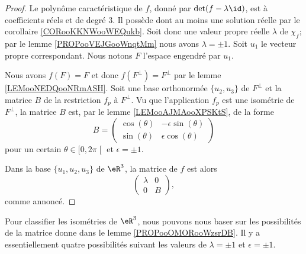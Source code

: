 \begin{proof}
    Le polynôme caractéristique de \( f\), donné par \( \det(f-\lambda\id)\), est à coefficients réels et de degré \( 3\). Il possède dont au moins une solution réelle par le corollaire \ref{CORooKKNWooWEQukb}. Soit donc une valeur propre réelle \( \lambda\) de \( \chi_f\); par le lemme \ref{PROPooVEJGooWnqtMm} nous avons \( \lambda=\pm 1\). Soit \( u_1\) le vecteur propre correspondant. Nous notons \( F\) l'espace engendré par \( u_1\).

    Nous avons \( f(F)=F\) et donc \( f(F^{\perp})=F^{\perp}\) par le lemme \ref{LEMooNEDQooNRmASH}. Soit une base orthonormée \( \{ u_2,u_3 \}\) de \( F^{\perp}\) et la matrice \( B\) de la restriction \( f_{p}\) à \( F^{\perp}\). Vu que l'application \( f_p\) est une isométrie de \( F^{\perp}\), la matrice \( B\) est, par le lemme \ref{LEMooAJMAooXPSKtS}, de la forme
    \begin{equation}
        B=\begin{pmatrix}
            \cos(\theta)    &   -\epsilon\sin(\theta)    \\ 
            \sin(\theta)    &   \epsilon\cos(\theta)    
        \end{pmatrix}
    \end{equation}
    pour un certain \( \theta\in\mathopen[ 0 , 2\pi \mathclose[\) et \( \epsilon=\pm 1\).

    Dans la base \( \{u_1,u_2,u_3\}\) de \( \eR^3\), la matrice de \( f\) est alors
    \begin{equation}
        \begin{pmatrix}
            \lambda    &   0    \\ 
            0    &   B    
        \end{pmatrix},
    \end{equation}
    comme annoncé.
\end{proof}

Pour classifier les isométries de \( \eR^3\), nous pouvons nous baser sur les possibilités de la matrice donne dans le lemme \ref{PROPooOMORooWzsrDB}. Il y a essentiellement quatre possibilités suivant les valeurs de \( \lambda=\pm 1\) et \( \epsilon=\pm 1\).

